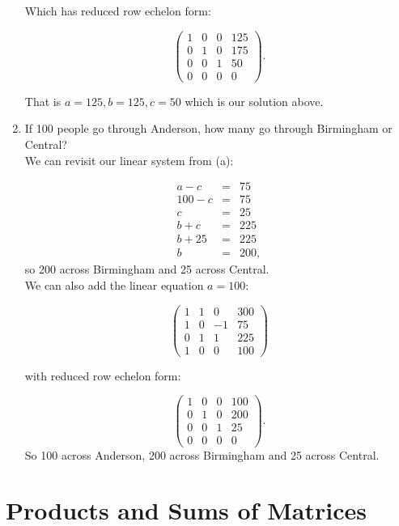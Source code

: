 \begin{example}
\begin{enumerate}
    Which has reduced row echelon form:
 
 $$ \left( \begin{array}{rrr|r}
1 & 0 & 0 & 125\\
0 & 1 & 0 & 175\\
0 & 0 & 1& 50\\
0 & 0 & 0& 0
\end{array}\right).$$   

That is $a=125, b=125, c=50$ which is our solution above.

\item If 100 people go through Anderson, how many go through Birmingham or Central?\\

We can revisit our linear system from (a):

    \begin{eqnarray*}
    a-c&=&75\\
    100-c&=&75\\
    c&=&25\\
    b+c&=&225\\
    b+25&=&225\\
    b&=&200,
    \end{eqnarray*}
so 200 across Birmingham and 25 across Central.\\

We can also add the linear equation $a=100$:

$$ \left( \begin{array}{rrr|r}
1 & 1 & 0& 300\\
1 & 0 & -1 & 75\\
0 & 1 & 1 & 225\\
1 & 0 & 0 & 100
\end{array}\right)$$

with reduced row echelon form:

$$ \left( \begin{array}{rrr|r}
1 & 0 & 0 & 100\\
0 & 1 & 0 & 200\\
0 & 0 & 1& 25\\
0 & 0 & 0& 0
\end{array}\right).$$  So 100 across Anderson, 200 across Birmingham and 25 across Central.
    
\end{enumerate}



\end{example}

\section{Products and Sums of Matrices}\label{Section:MatrixArithmetic}

